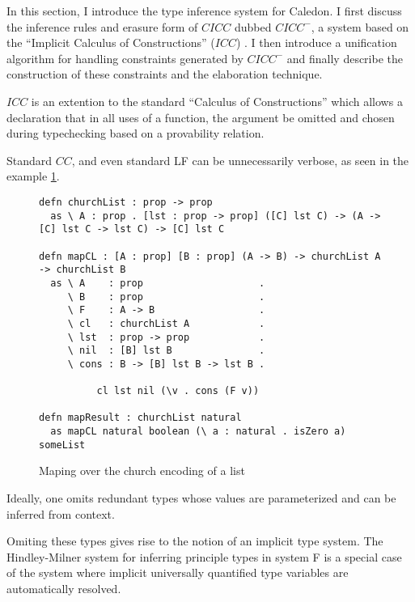 In this section, I introduce the type inference system for Caledon. 
I first discuss the inference rules and 
erasure form of $CICC$ dubbed $CICC^-$, 
a system based on the ``Implicit Calculus of Constructions'' ($ICC$) \citep{pollack1990implicit}. 
I then introduce a unification algorithm for handling constraints generated by $CICC^-$ and finally 
describe the construction of these constraints and the elaboration technique.

$ICC$ is an extention to the standard ``Calculus of Constructions'' which allows
a declaration that in all uses of a function, the argument be omitted 
and chosen during typechecking based on a provability relation.

Standard $CC$, and even standard LF 
can be unnecessarily verbose, as seen in the example \ref{code:long}.

\begin{figure}[h]
\begin{lstlisting}
defn churchList : prop -> prop
  as \ A : prop . [lst : prop -> prop] ([C] lst C) -> (A -> [C] lst C -> lst C) -> [C] lst C

defn mapCL : [A : prop] [B : prop] (A -> B) -> churchList A -> churchList B
  as \ A    : prop                    . 
     \ B    : prop                    .
     \ F    : A -> B                  . 
     \ cl   : churchList A            .
     \ lst  : prop -> prop            .
     \ nil  : [B] lst B               .
     \ cons : B -> [B] lst B -> lst B .

          cl lst nil (\v . cons (F v))

defn mapResult : churchList natural
  as mapCL natural boolean (\ a : natural . isZero a) someList

\end{lstlisting}
\caption{Maping over the church encoding of a list}
\label{code:long}
\end{figure}

Ideally, one omits redundant types whose values are parameterized 
and can be inferred from context. 

Omiting these types gives rise to the notion of an implicit type system.  
The Hindley-Milner \citep{hindley1969principal} system for inferring principle types in system F
is a special case of the system where implicit universally quantified type variables are automatically
resolved.
